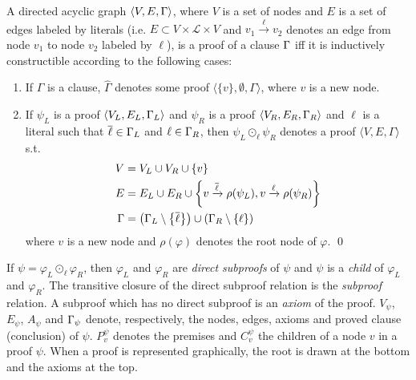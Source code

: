 \documentclass{llncs}
\begin{document}
\newcommand{\axiom}[1]{\widehat{#1}}
\newcommand{\n}{v}
\newcommand{\raiz}[1]{\rho(#1)}

\begin{definition}[Proof] 
\label{def:proof}
A directed acyclic graph $\langle V, E, \Gamma \rangle$, where $V$ is a set of nodes and $E$ is a
set of edges labeled by literals (i.e. $E \subset V \times \mathcal{L} \times V$ and $\n_1
\xrightarrow{\ell} \n_2$ denotes an edge from node $\n_1$ to node $\n_2$ labeled by $\ell$), is a
proof of a clause $\Gamma$ iff it is inductively constructible according to the following cases:
%
\begin{enumerate}
  \item If $\Gamma$ is a clause, $\axiom{\Gamma}$ denotes some proof $\langle \{ \n \}, \emptyset ,
    \Gamma \rangle$, where $\n$ is a new node.
  \item If $\psi_L$ is a proof $\langle V_L, E_L, \Gamma_L \rangle$ and
    $\psi_R$ is a proof $\langle V_R, E_R, \Gamma_R \rangle$ and $\ell$ is a literal such that
    $\overline{\ell} \in \Gamma_L$ and $\ell \in \Gamma_R$, then
    $\psi_L \odot_\ell \psi_R$ denotes a proof $\langle V, E, \Gamma \rangle$ s.t.
    \begin{align*}
      V &= V_L \cup V_R \cup \{\n \} \\
      E &= E_L \cup E_R \cup
                    \left\{ \n \xrightarrow{\dual{\ell}} \raiz{\psi_L}, \n \xrightarrow{\ell} \raiz{\psi_R} \right\} \\
     \Gamma &= \left( \clause_L \setminus \left\{ \dual{\ell} \right\} \right) \cup \left( \clause_R
                    \setminus \left\{ \ell \right\} \right)
    \end{align*}
    where $\n$ is a new node and $\raiz{\varphi}$ denotes the root node of $\varphi$.
  \qed
\end{enumerate}
\end{definition}


\newcommand{\Vertices}[1]{V_{#1}}
\newcommand{\Edges}[1]{E_{#1}}
\newcommand{\Conclusion}[1]{\clause_{#1}}
\newcommand{\Premises}[2]{P_{#1}^{#2}}
\newcommand{\Children}[2]{C_{#1}^{#2}}
\newcommand{\Axioms}[1]{A_{#1}}

\noindent
If $\psi = \varphi_L \odot_{\ell} \varphi_R$, then $\varphi_L$ and $\varphi_R$ are \emph{direct
subproofs} of $\psi$ and $\psi$ is a \emph{child} of $\varphi_L$ and $\varphi_R$. The
transitive closure of the direct subproof relation is the \emph{subproof} relation. A subproof which
has no direct subproof is an \emph{axiom} of the proof. 
%
$\Vertices{\psi}$, $\Edges{\psi}$, $\Axioms{\psi}$ and $\Conclusion{\psi}$
denote, respectively, the nodes, edges, axioms and proved clause (conclusion) of $\psi$. $\Premises{\n}{\psi}$ denotes the premises and $\Children{\n}{\psi}$ the children of a node $\n$ in a proof $\psi$. When a proof is represented graphically, the root is drawn at the bottom and the axioms at the top.
\end{document}
